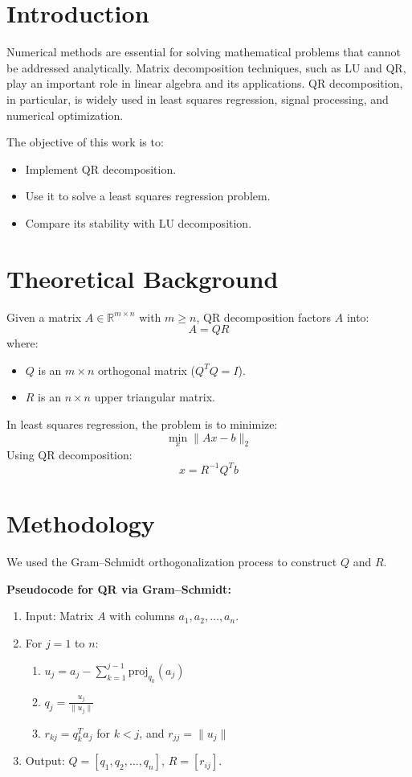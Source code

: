 \documentclass[14pt,a4paper]{article}
\begin{document}

\section{Introduction}
Numerical methods are essential for solving mathematical problems that cannot be addressed analytically. Matrix decomposition techniques, such as LU and QR, play an important role in linear algebra and its applications. QR decomposition, in particular, is widely used in least squares regression, signal processing, and numerical optimization.  

The objective of this work is to:  
\begin{itemize}
    \item Implement QR decomposition.  
    \item Use it to solve a least squares regression problem.  
    \item Compare its stability with LU decomposition.  
\end{itemize}

\section{Theoretical Background}
Given a matrix $A \in \mathbb{R}^{m \times n}$ with $m \geq n$, QR decomposition factors $A$ into:
\[
A = QR
\]
where:  
\begin{itemize}
    \item $Q$ is an $m \times n$ orthogonal matrix ($Q^TQ = I$).  
    \item $R$ is an $n \times n$ upper triangular matrix.  
\end{itemize}

In least squares regression, the problem is to minimize:
\[
\min_x \|Ax - b\|_2
\]
Using QR decomposition:
\[
x = R^{-1}Q^Tb
\]

\section{Methodology}
We used the Gram–Schmidt orthogonalization process to construct $Q$ and $R$.  

\vspace{0.5cm}
\noindent\textbf{Pseudocode for QR via Gram–Schmidt:}  
\begin{enumerate}
    \item Input: Matrix $A$ with columns $a_1, a_2, \dots, a_n$.  
    \item For $j = 1$ to $n$:  
    \begin{enumerate}
        \item $u_j = a_j - \sum_{k=1}^{j-1} \text{proj}_{q_k}(a_j)$  
        \item $q_j = \frac{u_j}{\|u_j\|}$  
        \item $r_{kj} = q_k^T a_j$ for $k < j$, and $r_{jj} = \|u_j\|$  
    \end{enumerate}
    \item Output: $Q = [q_1, q_2, \dots, q_n]$, $R = [r_{ij}]$.  
\end{enumerate}
\end{document}
